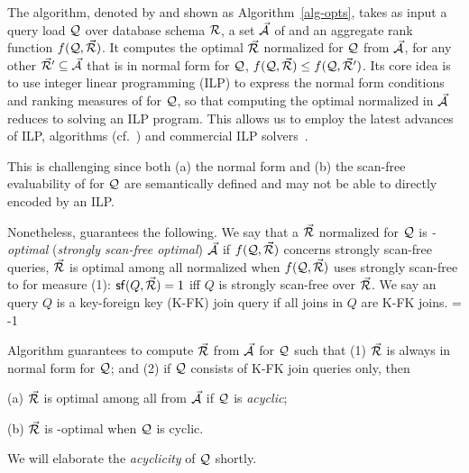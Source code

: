 {The algorithm, denoted by \opts and shown as
Algorithm~\ref{alg-opts}, takes as input a query load $\mathcal Q$ over
database schema ${\mathcal R}$, a set $\vec{{\mathcal A}}$ of \bss and an aggregate rank
function $f(\mathcal Q,\allowbreak \vec{{\mathcal R}})$.
It computes the optimal \bds $\vec{{\mathcal R}}$ normalized for $\mathcal Q$ from $\vec{{\mathcal A}}$,
\ie for any other \bds $\vec{{\mathcal R}}'\allowbreak \subseteq \allowbreak \vec{{\mathcal A}}$ that is in
normal form for $\mathcal Q$, $f(\mathcal Q,\allowbreak \vec{{\mathcal R}})\allowbreak \leq\allowbreak f(\mathcal Q,\allowbreak \vec{{\mathcal R}}')$.
%
Its core idea is to use integer linear programming (ILP) to
express the normal form conditions and ranking measures of \bdss
for $\mathcal Q$, so that computing the optimal normalized \bds in
$\vec{{\mathcal A}}$ reduces to solving an ILP program. This allows us to
employ the latest advances of ILP, \eg algorithms
(cf.~\cite{ILPbook}) and commercial ILP
solvers~\cite{cplex,gurobi,XpressMP}.


This is challenging since both (a) the normal form and (b) the
scan-free evaluability of \bdss for $\mathcal Q$ are semantically defined
and may not be able to directly encoded by an ILP.

\vspace{1ex}
Nonetheless, \opts guarantees the following. We say that
a \bds $\vec{{\mathcal R}}$ normalized for $\mathcal Q$ is {\em \ssf-optimal}
({\em strongly scan-free optimal}) \wrt $\vec{{\mathcal A}}$ if $f(\mathcal Q, \vec{{\mathcal R}})$
concerns strongly scan-free queries, \ie $\vec{{\mathcal R}}$ is optimal
among all normalized \bdss when $f(\mathcal Q, \vec{{\mathcal R}})$ uses strongly
scan-free to for measure (1): ${\mathsf{sf}}(Q,\allowbreak \vec{{\mathcal R}}) \allowbreak = \allowbreak 1$
iff $Q$ is strongly scan-free over $\vec{{\mathcal R}}$. We say an \SPC
query $Q$ is a key-foreign key (K-FK) join query if all joins in
$Q$ are K-FK joins.
\looseness = -1

\vspace{-0.3ex}
\begin{theorem}\label{thm-opts}
Algorithm \opts guarantees to compute $\vec{{\mathcal R}}$ from $\vec{{\mathcal A}}$
for $\mathcal Q$ such that
(1) $\vec{{\mathcal R}}$ is always in normal form for $\mathcal Q$; and
(2) if $\mathcal Q$ consists of K-FK join \SPC queries only, then
\bi
\item[(a)] $\vec{{\mathcal R}}$ is optimal among all \bdss from $\vec{{\mathcal A}}$
  if $\mathcal Q$ is {\em acyclic}; 
\item[(b)] $\vec{{\mathcal R}}$ is \ssf-optimal when $\mathcal Q$ is cyclic. 
\ei
\vspace{-3.5ex}
\end{theorem}

We will elaborate the {\em acyclicity} of $\mathcal Q$ shortly.

}
